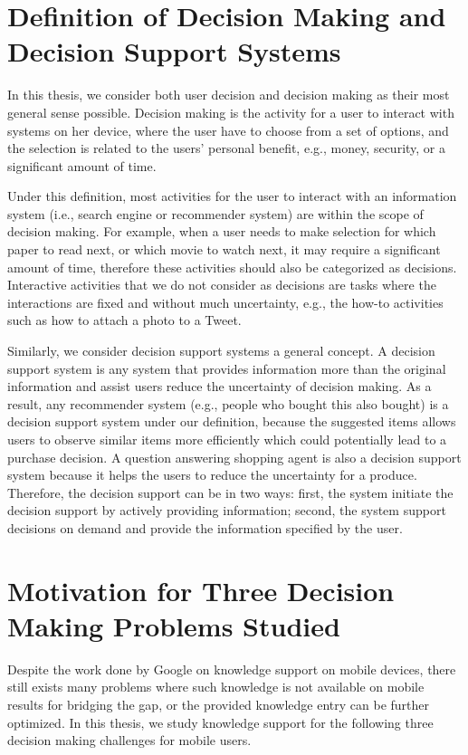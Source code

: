 
\section{Definition of Decision Making and Decision Support Systems}

In this thesis, we consider both user decision and decision making as their most general sense possible. Decision making is the activity for a user to interact with systems on her device, where the user have to choose from a set of options, and the selection is related to the users' personal benefit, e.g., money, security, or a significant amount of time. 

Under this definition, most activities for the user to interact with an information system (i.e., search engine or recommender system) are within the scope of decision making. For example, when a user needs to make selection for which paper to read next, or which movie to watch next, it may require a significant amount of time, therefore these activities should also be categorized as decisions. Interactive activities that we do not consider as decisions are tasks where the interactions are fixed and without much uncertainty, e.g., the how-to activities such as how to attach a photo to a Tweet. 

Similarly, we consider decision support systems a general concept. A decision support system is any system that provides information more than the original information and assist users reduce the uncertainty of decision making. As a result, any recommender system (e.g., people who bought this also bought) is a decision support system under our definition, because the suggested items allows users to observe similar items more efficiently which could potentially lead to a purchase decision. A question answering shopping agent is also a decision support system because it helps the users to reduce the uncertainty for a produce. Therefore, the decision support can be in two ways: first, the system initiate the decision support by actively providing information; second, the system support decisions on demand and provide the information specified by the user. 

\section{Motivation for Three Decision Making Problems Studied}
\label{ch1:sec3:overview}

Despite the work done by Google on knowledge support on mobile devices, there still exists many problems where such knowledge is not available on mobile results for bridging the gap, or the provided knowledge entry can be further optimized. In this thesis, we study knowledge support for the following three decision making challenges for mobile users. 


